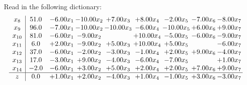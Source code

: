 \documentclass[9pt]{article}
\begin{document}
Read in the following dictionary:
\[\begin{array}{c| c c@{\hskip 2pt} c@{\hskip 2pt} c@{\hskip 2pt} c@{\hskip 2pt} c@{\hskip 2pt} c@{\hskip 2pt} c@{\hskip 2pt} }
 x_{8}   &  51.0 & -6.00 x_{1} & -10.00 x_{2} & +  7.00 x_{3} & +  8.00 x_{4} & -2.00 x_{5} & -7.00 x_{6} & -8.00 x_{7}\\
 x_{9}   &  96.0 & -7.00 x_{1} & -10.00 x_{2} & -10.00 x_{3} & -6.00 x_{4} & -10.00 x_{5} & +  6.00 x_{6} & +  9.00 x_{7}\\
 x_{10}   &  81.0 & -6.00 x_{1} & -9.00 x_{2} &   & + 10.00 x_{4} & -5.00 x_{5} & -6.00 x_{6} & -9.00 x_{7}\\
 x_{11}   &  6.0 & +  2.00 x_{1} & -9.00 x_{2} & +  5.00 x_{3} & + 10.00 x_{4} & +  5.00 x_{5} &   & -6.00 x_{7}\\
 x_{12}   &  37.0 & -6.00 x_{1} & -2.00 x_{2} & -3.00 x_{3} & -1.00 x_{4} & +  2.00 x_{5} & +  9.00 x_{6} & -4.00 x_{7}\\
 x_{13}   &  17.0 & -3.00 x_{1} & +  9.00 x_{2} & -4.00 x_{3} & -6.00 x_{4} & -7.00 x_{5} &   & +  1.00 x_{7}\\
 x_{14}   &  -2.0 & -6.00 x_{1} & +  3.00 x_{2} & +  5.00 x_{3} & +  2.00 x_{4} & +  2.00 x_{5} & +  7.00 x_{6} & +  9.00 x_{7}\\
\hline
z    &  0.0 & +  1.00 x_{1} & +  2.00 x_{2} & -4.00 x_{3} & +  1.00 x_{4} & -1.00 x_{5} & +  3.00 x_{6} & -3.00 x_{7}\\
\end{array}\]
\end{document}

